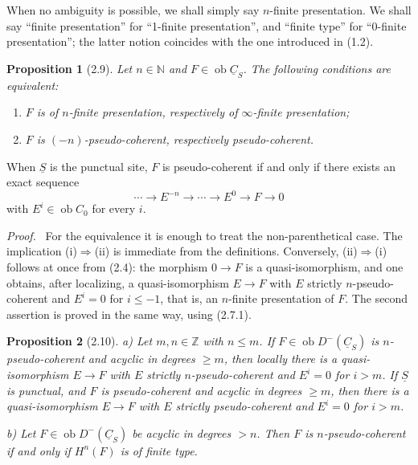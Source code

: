 \documentclass[13pt]{extarticle}
\newcommand{\ZZ}{\mathbb Z}
\newcommand{\NN}{\mathbb N}
\newcommand{\uS}{\underline S}
\newcommand{\uC}{\underline C}
\newcommand{\ob}{\operatorname{ob}}
\newenvironment{prooftext}[1][Proof]{\par\noindent\emph{#1.}\ }{\par\medskip}
\newtheorem*{proposition*}{Proposition}
\begin{document}
When no ambiguity is possible, we shall simply say $n$-finite presentation. We shall say ``finite presentation'' for ``1-finite presentation'', and ``finite type'' for ``0-finite presentation''; the latter notion coincides with the one introduced in (1.2).

\begin{proposition*}[2.9]
Let $n\in\NN$ and $F\in\ob\uC_S$. The following conditions are equivalent:
\begin{enumerate}[label=(\roman*)]
\item $F$ is of $n$-finite presentation, respectively of $\infty$-finite presentation;
\item $F$ is $(-n)$-pseudo-coherent, respectively pseudo-coherent.
\end{enumerate}
\end{proposition*}

When $\uS$ is the punctual site, $F$ is pseudo-coherent if and only if there exists an exact sequence
\[
\cdots\longrightarrow E^{-n}\longrightarrow\cdots\longrightarrow E^0\longrightarrow F\longrightarrow0
\]
with $E^i\in\ob C_0$ for every $i$.

\begin{prooftext}
For the equivalence it is enough to treat the non-parenthetical case. The implication (i)$\Rightarrow$(ii) is immediate from the definitions. Conversely, (ii)$\Rightarrow$(i) follows at once from (2.4): the morphism $0\to F$ is a quasi-isomorphism, and one obtains, after localizing, a quasi-isomorphism $E\to F$ with $E$ strictly $n$-pseudo-coherent and $E^i=0$ for $i\leq -1$, that is, an $n$-finite presentation of $F$. The second assertion is proved in the same way, using (2.7.1).
\end{prooftext}

\begin{proposition*}[2.10]
\textup{a)} Let $m,n\in\ZZ$ with $n\leq m$. If $F\in\ob D^-(\uC_S)$ is $n$-pseudo-coherent and acyclic in degrees $\geq m$, then locally there is a quasi-isomorphism $E\to F$ with $E$ strictly $n$-pseudo-coherent and $E^i=0$ for $i>m$. If $\uS$ is punctual, and $F$ is pseudo-coherent and acyclic in degrees $\geq m$, then there is a quasi-isomorphism $E\to F$ with $E$ strictly pseudo-coherent and $E^i=0$ for $i>m$.

\textup{b)} Let $F\in\ob D^-(\uC_S)$ be acyclic in degrees $>n$. Then $F$ is $n$-pseudo-coherent if and only if $H^n(F)$ is of finite type.
\end{proposition*}
\end{document}
